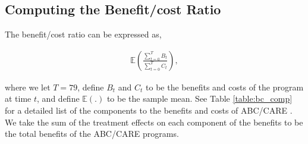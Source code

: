 


\subsection{Computing the Benefit/cost Ratio}
\label{app:method_cbratio}

\noindent The benefit/cost ratio can be expressed as,

\begin{align}
\mathbb{E} \left( \frac{ \sum_{t=0}^T B_t}{\sum_{t=0}^T C_t} \right),
\end{align}

\noindent where we let $T = 79$, define $B_t$ and $C_t$ to be the benefits and costs of the
program at time $t$, and define $\mathbb{E}(.)$ to be the sample mean. See Table \ref{table:bc_comp} for a detailed list of the components
to the benefits and costs of ABC/CARE . We take the sum of the treatment effects on each component
of the benefits to be the total benefits of the ABC/CARE programs. \\

